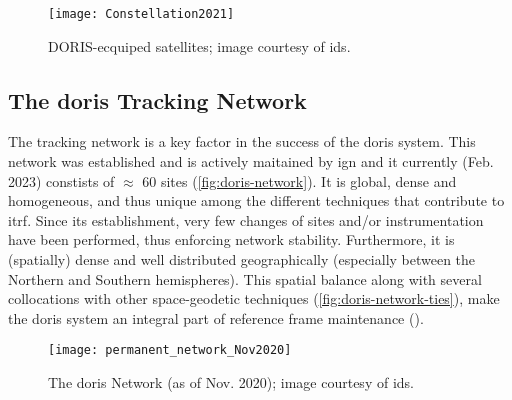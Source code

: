 \begin{figure}[h!]
  \centering
  \texttt{[image: Constellation2021]}
  \caption{DORIS-ecquiped satellites; image courtesy of \gls{ids}.}
  \label{fig:doris-constellations}
\end{figure}

\iffalse
\begin{description}
  \item[Atmospheric Studies] including troposphere () and ionosphere ()
  \item[Reference Frames] \cite{Willis2007}
  \item[Space Weather and Solar Activity] \cite{Willis2005}
  \item[Tectonics] \cite{}
\end{description}
\fi

\subsection{The \gls{doris} Tracking Network}\label{ssec:doris-tracking-network}
The tracking network is a key factor in the success of the \gls{doris} system. 
This network was established and is actively maitained by \gls{ign} and it currently 
(Feb. 2023) constists of $\approx$ 60 sites (\autoref{fig:doris-network}). It is global, dense 
and homogeneous, and thus unique among the different techniques that contribute to 
\gls{itrf}. Since its establishment, very few changes of sites and/or instrumentation 
have been performed, thus enforcing network stability. Furthermore, it is (spatially) 
dense and well distributed geographically (especially between the Northern and  
Southern hemispheres). This spatial balance along with several collocations with 
other space-geodetic techniques (\autoref{fig:doris-network-ties}), make the 
\gls{doris} system an integral part of reference frame maintenance (\cite{Moreaux2022}).

\begin{figure}[h]
  \centering
  \texttt{[image: permanent\_network\_Nov2020]}
  \caption{The \gls{doris} Network (as of Nov. 2020); image courtesy of \gls{ids}.}
  \label{fig:doris-network}
\end{figure}

